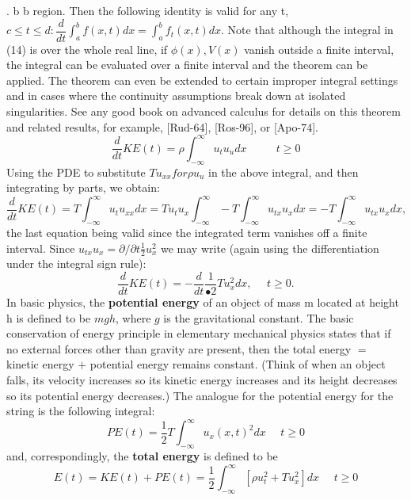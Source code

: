 \documentclass[../main.tex]{subfiles}
\begin{document}
{{{. b b region. Then the following identity is valid for any t, $c\leqslant t \leqslant d : \dfrac{d}{dt} \int_{a}^{b} f(x,t)dx=\int_{a}^{b} f_t (x,t) dx$. Note that 
although the integral in (14) is over the whole real line, if $\phi(x), V(x)$ vanish outside a finite interval, 
the integral can be evaluated over a finite interval and the theorem can be applied. The theorem can 
even be extended to certain improper integral settings and in cases where the continuity assumptions 
break down at isolated singularities. See any good book on advanced calculus for details on this 
theorem and related results, for example, [Rud-64], [Ros-96], or [Apo-74]. } 
\begin{equation}
\frac{d}{dt} KE(t)=\rho \int_{-\infty}^{\infty} u_t u_u dx ~~~~~~~~~~~~ t\geq 0
\end{equation}
Using the PDE to substitute $Tu_{xx} for \rho u_u$ in the above integral, and then 
integrating by parts, we obtain:
$$
\frac{d}{dt} KE(t)=T \int_{-\infty}^{\infty} u_t u_{xx} dx=Tu_t u_x \int_{-\infty}^{\infty} -T \int_{-\infty}^{\infty} u_{tx} u_x dx =-T \int_{-\infty}^{\infty} u_{tx} u_x dx,
$$
the last equation being valid since the integrated term vanishes off a finite interval. Since $u_{tx} u_x = \partial / \partial t \frac{1}{2} u_x^2$ we may write (again using the differentiation under the 
integral sign rule):
\begin{equation}
\dfrac{d}{dt} KE(t)= -\dfrac{d}{dt}  \dfrac{1}{•2} Tu_{x}^{2} dx, ~~~~~~t\geq 0.
\end{equation}
In basic physics, the \textbf{potential energy} of an object of mass m located at height h is 
defined to be $mgh$, where $g$ is the gravitational constant. The basic conservation of 
energy principle in elementary mechanical physics states that if no external forces 
other than gravity are present, then the total energy $=$ kinetic energy $+$ potential 
energy remains constant. (Think of when an object falls, its velocity increases so 
its kinetic energy increases and its height decreases so its potential energy 
decreases.) The analogue for the potential energy for the string is the following 
integral: 
\begin{equation}
PE(t)=\dfrac{1}{2} T \int_{-\infty}^{\infty} u_x (x,t)^2 dx ~~~~~~t\geq 0
\end{equation}
and, correspondingly, the \textbf{total energy} is defined to be
\begin{equation}
E(t)=KE(t)+PE(t)=\dfrac{1}{2} \int_{-\infty}^{\infty} [\rho u_t^2 + Tu_x^2] dx ~~~~~~t\geq 0
\end{equation}
}}
\end{document}
